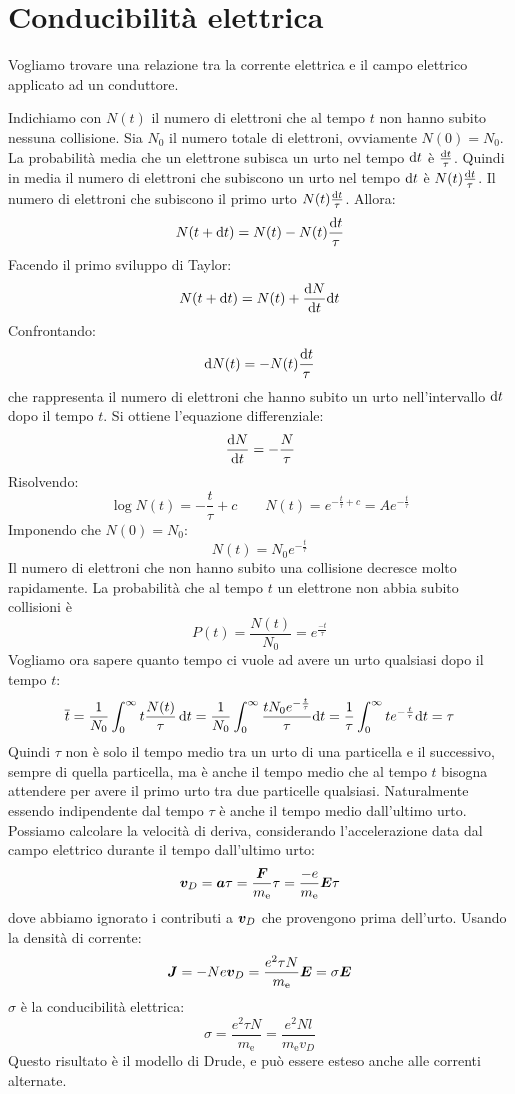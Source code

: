 \section{Conducibilità elettrica}
Vogliamo trovare una relazione tra la corrente elettrica e il campo elettrico applicato ad un conduttore.

Indichiamo con $N(t)$ il numero di elettroni che al tempo $t$ non hanno subito nessuna collisione. Sia $N_0$ il numero totale di elettroni, ovviamente $N(0)=N_0$. La probabilità media che un elettrone subisca un urto nel tempo $\mathrm{d} t$ è $\frac{\mathrm{d} t}{\tau}$. Quindi in media il numero di elettroni che subiscono un urto nel tempo $\mathrm{d} t$ è $N(t)\frac{\mathrm{d} t}{\tau}$. Il numero di elettroni che subiscono il primo urto $N(t)\frac{\mathrm{d} t}{\tau}$. Allora:
\[N(t+\mathrm{d} t)=N(t)-N(t)\frac{\mathrm{d} t}{\tau}\]
Facendo il primo sviluppo di Taylor:
\[N(t+\mathrm{d} t)=N(t)+\frac{\mathrm{d} N}{\mathrm{d} t}\mathrm{d} t\]
Confrontando:
\[\mathrm{d} N(t)=-N(t)\frac{\mathrm{d} t}{\tau}\]
che rappresenta il numero di elettroni che hanno subito un urto nell'intervallo $\mathrm{d} t$ dopo il tempo $t$. Si ottiene l'equazione differenziale:
\[\frac{\mathrm{d} N}{\mathrm{d} t}=-\frac{N}{\tau}\]
Risolvendo:
\[\log N(t)=-\frac{t}{\tau}+c \qquad N(t)=e^{-\frac{t}{\tau}+c}=Ae^{-\frac{t}{\tau}}\]
Imponendo che $N(0)=N_0$:
\[N(t)=N_0e^{-\frac{t}{\tau}}\]
Il numero di elettroni che non hanno subito una collisione decresce molto rapidamente. La probabilità che al tempo $t$ un elettrone non abbia subito collisioni è
\[P(t)=\frac{N(t)}{N_0}=e^{\frac{-t}{\tau}}\]
Vogliamo ora sapere quanto tempo ci vuole ad avere un urto qualsiasi dopo il tempo $t$:
\[\overline{t}=\frac{1}{N_0}\int_0^\infty t\frac{N(t)}{\tau}\,\mathrm{d} t=\frac{1}{N_0}\int_0^\infty\frac{tN_0 e^{-\frac{t}{\tau}}}{\tau}\mathrm{d} t=\frac{1}{\tau}\int_0^\infty te^{-\frac{t}{\tau}} \mathrm{d} t=\tau\]
Quindi $\tau$ non è solo il tempo medio tra un urto di una particella e il successivo, sempre di quella particella, ma è anche il tempo medio che al tempo $t$ bisogna attendere per avere il primo urto tra due particelle qualsiasi. Naturalmente essendo indipendente dal tempo $\tau$ è anche il tempo medio dall'ultimo urto. Possiamo calcolare la velocità di deriva, considerando l'accelerazione data dal campo elettrico durante il tempo dall'ultimo urto:
\[\boldsymbol{v}_D=\boldsymbol{a}\tau=\frac{\boldsymbol{F}}{m_\mathrm{e}}\tau=\frac{-e}{m_\mathrm{e}}{\boldsymbol{E}}\tau\]
dove abbiamo ignorato i contributi a $\boldsymbol{v}_D$ che provengono prima dell'urto. Usando la densità di corrente:
\[\boldsymbol{J}=-Ne\boldsymbol{v}_D=\frac{e^2\tau N}{m_\mathrm{e}}\boldsymbol{E}=\sigma\boldsymbol{E}\]
$\sigma$ è la conducibilità elettrica:
\[\sigma=\frac{e^2\tau N}{m_\mathrm{e}}=\frac{e^2Nl}{m_\mathrm{e}v_D}\]
Questo risultato è il modello di Drude, e può essere esteso anche alle correnti alternate.

